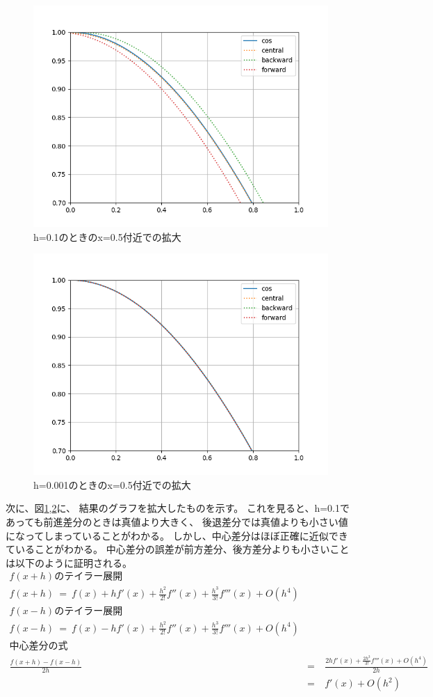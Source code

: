 \documentclass[dvipdfmx]{jsarticle}
\begin{document}
\begin{figure}[htbp]
  \centering
  \includegraphics[width=0.7\hsize]{../pics/h=0_1_large.png}
  \caption{h=0.1のときのx=0.5付近での拡大}
  \label{fig:h_01_large}
\end{figure}

\begin{figure}[htbp]
  \centering
  \includegraphics[width=0.7\hsize]{../pics/h=0_001_large.png}
  \caption{h=0.001のときのx=0.5付近での拡大}
  \label{fig:h_0001_large}
\end{figure}

次に、図\ref{fig:h_01_large},\ref{fig:h_0001_large}に、
結果のグラフを拡大したものを示す。
これを見ると、h=0.1であっても前進差分のときは真値より大きく、
後退差分では真値よりも小さい値になってしまっていることがわかる。
しかし、中心差分はほぼ正確に近似できていることがわかる。
中心差分の誤差が前方差分、後方差分よりも小さいことは以下のように証明される。
\begin{eqnarray}[H]
  f(x+h)のテイラー展開\nonumber\\
  f(x+h) ~=~ f(x)+hf'(x)+\frac{h^2}{2!}f''(x)+\frac{h^3}{3!}f'''(x)+O(h^4) \\
  f(x-h)のテイラー展開\nonumber\\
  f(x-h) ~=~ f(x)-hf'(x)+\frac{h^2}{2!}f''(x)+\frac{h^3}{3!}f'''(x)+O(h^4) \\
  中心差分の式\nonumber\\
  \frac{f(x+h)-f(x-h)}{2h} ~&=&~ \frac{2hf'(x)+\frac{2h^3}{3!}f'''(x)+O(h^4)}{2h}\\
  &=&~ f'(x)+O(h^2)
\end{eqnarray}
\end{document}
